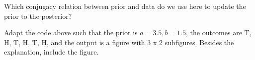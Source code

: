 \begin{exercise}
Which conjugacy relation between prior and data do we use here to update the prior to the posterior?
\end{exercise}

\begin{exercise}
Adapt the  code above such that the prior is $a=3.5, b= 1.5$, the outcomes are T, H, T, H, T, H, and the output is a figure with 3 x 2 subfigures. Besides the explanation, include the figure.
\begin{solution}
\end{solution}
\end{exercise}




